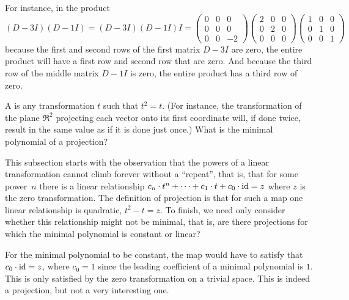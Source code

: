 \begin{exercises}
\begin{answer}
       For instance, in the product 
       \begin{equation*}
         (D-3I)(D-1I)=(D-3I)(D-1I)I=
         \begin{pmatrix}
           0  &0  &0  \\
           0  &0  &0  \\
           0  &0  &-2        
         \end{pmatrix}
         \begin{pmatrix}
           2  &0  &0  \\
           0  &2  &0  \\
           0  &0  &0
         \end{pmatrix}
         \begin{pmatrix}
           1  &0  &0  \\
           0  &1  &0  \\
           0  &0  &1
         \end{pmatrix}
       \end{equation*}
       because the first and second rows of the first matrix $D-3I$ are
       zero, the entire product will have a first row and second
       row that are zero.
       And because the third row of the middle matrix $D-1I$ is zero,
       the entire product has a third row of zero.
    \end{answer}
  \recommended \item 
    A %
    is any transformation \( t \) such that \( t^2=t \).
    (For instance, the transformation of the plane $\Re^2$ projecting
    each vector onto its first coordinate will, if done twice,
    result in the same value as if it is done just once.)
    What is the minimal polynomial of a projection?
    \begin{answer}
      This subsection starts with the observation that the powers of 
      a linear transformation cannot climb forever without a ``repeat'',
      that is, that for some power~$n$ there is a linear relationship
      $c_n\cdot t^n+\dots+c_1\cdot t+c_0\cdot \mbox{id}=z$ where $z$ is the
      zero transformation.
      The definition of projection is that for such a map
      one linear relationship is quadratic, $t^2-t=z$.
      To finish, we need only consider whether this relationship might not
      be minimal, that is, are there projections for which the 
      minimal polynomial is constant or linear?

      For the minimal polynomial to be constant, the map would have to
      satisfy that $c_0\cdot\mbox{id}=z$, where $c_0=1$ since the leading
      coefficient of a minimal polynomial is $1$.
      This is only satisfied by the zero transformation on a trivial space.
      This is indeed a projection, but not a very interesting one.


\end{answer}
\end{exercises}
